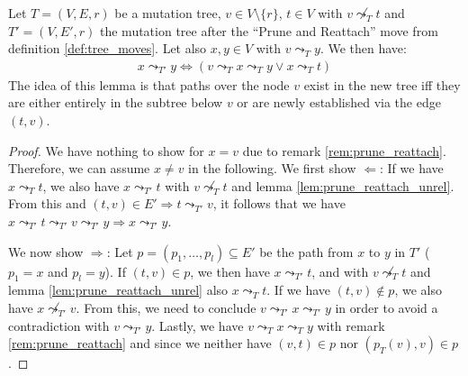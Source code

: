 \begin{lemma}
    \label{lem:prune_reattach_rel}
    Let $T = (V, E, r)$ be a mutation tree, $v \in V \setminus \{r\}$, $t \in V$ with $v \not\leadsto_T t$ and $T' = (V, E', r)$ the mutation tree after the ``Prune and Reattach'' move from definition \ref{def:tree_moves}. Let also $x, y \in V$ with $v \leadsto_T y$. We then have:
    \begin{align*}
        x \leadsto_{T'} y \Leftrightarrow (v \leadsto_T x \leadsto_T y \vee x \leadsto_T t)
    \end{align*}
    The idea of this lemma is that paths over the node $v$ exist in the new tree iff they are either entirely in the subtree below $v$ or are newly established via the edge $(t, v)$.
\end{lemma}

\begin{proof}
    We have nothing to show for $x = v$ due to remark \ref{rem:prune_reattach}. Therefore, we can assume $x \neq v$ in the following. We first show $\Leftarrow$: If we have $x \leadsto_T t$, we also have $x \leadsto_{T'} t$ with $v \not\leadsto_T t$ and lemma \ref{lem:prune_reattach_unrel}. From this and $(t, v) \in E' \Rightarrow t \leadsto_{T'} v$, it follows that we have $x \leadsto_{T'} t \leadsto_{T'} v \leadsto_{T'} y \Rightarrow x \leadsto_{T'} y$.

    We now show $\Rightarrow$: Let $p = (p_1, \dots, p_l) \subseteq E'$ be the path from $x$ to $y$ in $T'$ ($p_1 = x$ and $p_l = y$). If $(t, v) \in p$, we then have $x \leadsto_{T'} t$, and with $v \not\leadsto_T t$ and lemma \ref{lem:prune_reattach_unrel} also $x \leadsto_T t$. If we have $(t, v) \notin p$, we also have $x \not\leadsto_{T'} v$. From this, we need to conclude $v \leadsto_{T'} x \leadsto_{T'} y$ in order to avoid a contradiction with $v \leadsto_{T'} y$. Lastly, we have $v \leadsto_T x \leadsto_T y$ with remark \ref{rem:prune_reattach} and since we neither have $(v, t) \in p$ nor $(p_T(v), v) \in p$.
\end{proof}

